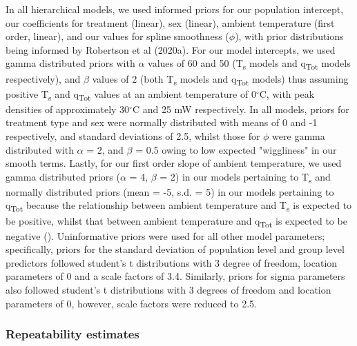 \documentclass[12pt]{article}
\begin{document}
\noindent In all hierarchical models, we used informed priors for our population intercept, our coefficients for treatment (linear), sex (linear), ambient temperature (first order, linear), and our values for spline smoothness ($\phi$), with prior distributions being informed by Robertson et al (2020a). For our model intercepts, we used gamma distributed priors with $\alpha$ values of 60 and 50 (T\textsubscript{s} models and q\textsubscript{Tot} models respectively), and $\beta$ values of 2 (both T\textsubscript{s} models and q\textsubscript{Tot} models) thus assuming positive T\textsubscript{s} and q\textsubscript{Tot} values at an ambient temperature of 0$^{\circ}$C, with peak densities of approximately 30$^{\circ}$C and 25 mW respectively. In all models, priors for treatment type and sex were normally distributed with means of 0 and -1 respectively, and standard deviations of 2.5, whilst those for $\phi$ were gamma distributed with $\alpha$ = 2, and $\beta$ = 0.5 owing to low expected "wiggliness" in our smooth terms. Lastly, for our first order slope of ambient temperature, we used gamma distributed priors ($\alpha$ = 4, $\beta$ = 2) in our models pertaining to T\textsubscript{s} and normally distributed priors (mean = -5, s.d. = 5) in our models pertaining to q\textsubscript{Tot} because the relationship between ambient temperature and T\textsubscript{s} is expected to be positive, whilst that between ambient temperature and q\textsubscript{Tot} is expected to be negative (\citealt{robertson_2020b}). Uninformative priors were used for all other model parameters; specifically, priors for the standard deviation of population level and group level predictors followed student's t distributions with 3 degree of freedom, location parameters of 0 and a scale factors of 3.4. Similarly, priors for sigma parameters also followed student's t distributions with 3 degrees of freedom and location parameters of 0, however, scale factors were reduced to 2.5.\vspace{0.5cm}

\subsubsection{Repeatability estimates}
\vspace{0.5cm}
\end{document}
